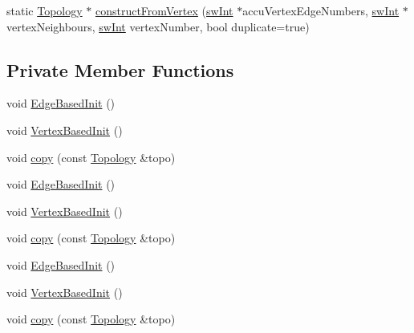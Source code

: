 \begin{DoxyCompactItemize}
\item 
static \mbox{\hyperlink{classUNAT_1_1Topology}{Topology}} $\ast$ \mbox{\hyperlink{classUNAT_1_1Topology_a01e9873d9c9d7b585632a4fcef1bbd57}{construct\+From\+Vertex}} (\mbox{\hyperlink{include_2swMacro_8h_a113cf5f6b5377cdf3fac6aa4e443e9aa}{sw\+Int}} $\ast$accu\+Vertex\+Edge\+Numbers, \mbox{\hyperlink{include_2swMacro_8h_a113cf5f6b5377cdf3fac6aa4e443e9aa}{sw\+Int}} $\ast$vertex\+Neighbours, \mbox{\hyperlink{include_2swMacro_8h_a113cf5f6b5377cdf3fac6aa4e443e9aa}{sw\+Int}} vertex\+Number, bool duplicate=true)
\end{DoxyCompactItemize}
\subsection*{Private Member Functions}
\begin{DoxyCompactItemize}
\item 
void \mbox{\hyperlink{classUNAT_1_1Topology_a7d880e2443af9721908ec8607baf968d}{Edge\+Based\+Init}} ()
\item 
void \mbox{\hyperlink{classUNAT_1_1Topology_ad9846b484f49c6b4c55c5f9dbe6c6e77}{Vertex\+Based\+Init}} ()
\item 
void \mbox{\hyperlink{classUNAT_1_1Topology_a7c875a40bf0676622b5cb4915747417d}{copy}} (const \mbox{\hyperlink{classUNAT_1_1Topology}{Topology}} \&topo)
\item 
void \mbox{\hyperlink{classUNAT_1_1Topology_a7d880e2443af9721908ec8607baf968d}{Edge\+Based\+Init}} ()
\item 
void \mbox{\hyperlink{classUNAT_1_1Topology_ad9846b484f49c6b4c55c5f9dbe6c6e77}{Vertex\+Based\+Init}} ()
\item 
void \mbox{\hyperlink{classUNAT_1_1Topology_a7c875a40bf0676622b5cb4915747417d}{copy}} (const \mbox{\hyperlink{classUNAT_1_1Topology}{Topology}} \&topo)
\item 
void \mbox{\hyperlink{classUNAT_1_1Topology_a7d880e2443af9721908ec8607baf968d}{Edge\+Based\+Init}} ()
\item 
void \mbox{\hyperlink{classUNAT_1_1Topology_ad9846b484f49c6b4c55c5f9dbe6c6e77}{Vertex\+Based\+Init}} ()
\item 
void \mbox{\hyperlink{classUNAT_1_1Topology_a7c875a40bf0676622b5cb4915747417d}{copy}} (const \mbox{\hyperlink{classUNAT_1_1Topology}{Topology}} \&topo)
\end{DoxyCompactItemize}
